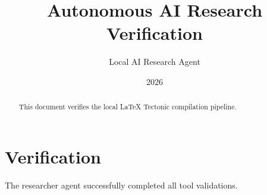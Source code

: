 \documentclass{article}
\title{Autonomous AI Research Verification}
\author{Local AI Research Agent}
\date{2026}
\begin{document}
\maketitle
\begin{abstract}
This document verifies the local LaTeX Tectonic compilation pipeline.
\end{abstract}
\section{Verification}
The researcher agent successfully completed all tool validations.
\end{document}
